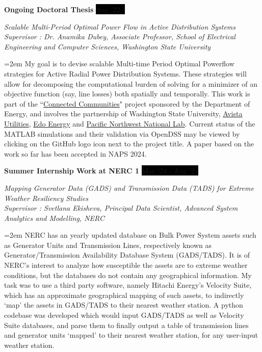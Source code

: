\documentclass[paper=a4,fontsize=11pt]{scrartcl} %
\newcommand{\sepspace}{\vspace*{1em}}		%
\newcommand{\EducationEntry}[4]{
		\noindent \textbf{#1} \hfill      %
		\colorbox{Black}{%
			\parbox{10em}{%
			\hfill\color{White}#2}} \par  %
		\noindent \textit{#3} \par        %
		\noindent\hangindent=2em\hangafter=0 \small #4 %
		\normalsize \par}
\newcommand{\WorkEntry}[4]{				  %
		\noindent \textbf{#1} \hfill      %
		\colorbox{Black}{\color{White}#2} \par  %
		\noindent \textit{#3} \par              %
		\noindent\hangindent=2em\hangafter=0 \small #4 %
		\normalsize \par}
\begin{document}
\WorkEntry{Ongoing Doctoral Thesis}{Aug '22 - }{Scalable Multi-Period Optimal Power Flow in Active Distribution Systems \href{https://github.com/Realife-Brahmin/MultiPeriod-DistOPF-Benchmark}{\textcolor{matlaborange}{\faGithub}}\\ Supervisor : Dr. Anamika Dubey, Associate Professor, School of Electrical Engineering and Computer Sciences, Washington State University}{My goal is to devise scalable Multi-time Period Optimal Powerflow strategies for Active Radial Power Distribution Systems. These strategies will allow for decomposing the computational burden of solving for a minimizer of an objective function (say, line losses) both spatially and temporally. This work is part of the ``\href{https://www.energy.gov/eere/solar/connected-communities-funding-program}{Connected Communities}" project sponsored by the Department of Energy, and involves the partnership of Washington State University, \href{https://investor.avistacorp.com/}{Avista Utilities}, \href{https://edoenergy.com/about-edo/}{Edo Energy} and \href{https://www.pnnl.gov/about}{Pacific Northwest National Lab}. Current status of the MATLAB simulations and their validation via OpenDSS may be viewed by clicking on the GitHub logo icon next to the project title. A paper based on the work so far has been accepted in NAPS 2024.}

\sepspace 

\WorkEntry{Summer Internship Work at NERC 1}{May '24 - Aug '24}{Mapping Generator Data (GADS) and Transmission Data (TADS) for Extreme Weather Resiliency Studies \href{https://github.com/Realife-Brahmin/Mapping-GADS-and-TADS-repo}{\textcolor{pythonblue}{\faGithub}}\\ Supervisor : Svetlana Ekisheva, Principal Data Scientist, Advanced System Analytics and Modelling, NERC}
{NERC has an yearly updated database on Bulk Power System assets such as Generator Units and Transmission Lines, respectively known as Generator/Transmission Availability Database System (GADS/TADS). It is of NERC's interest to analyze how susceptible the assets are to extreme weather conditions, but the databases do not contain any geographical information. My task was to use a third party software, namely Hitachi Energy's Velocity Suite, which has an approximate geographical mapping of such assets, to indirectly `map' the assets in GADS/TADS to their nearest weather station. A python codebase was developed which would input GADS/TADS as well as Velocity Suite databases, and parse them to finally output a table of transmission lines and generator units `mapped' to their nearest weather station, for any user-input weather station.}
\end{document}
